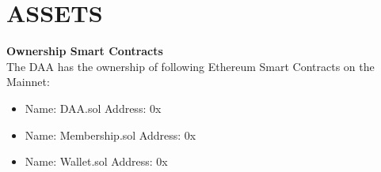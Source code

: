 \section{ASSETS}

\item \textbf{Ownership Smart Contracts} \\
The DAA has the ownership of following Ethereum Smart Contracts on the Mainnet:
\begin{itemize}
    \item Name: DAA.sol Address: 0x %
    \item Name: Membership.sol Address: 0x %
    \item Name: Wallet.sol Address: 0x %
\end{itemize}


